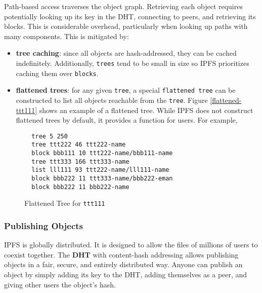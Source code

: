 \documentclass{sig-alternate}
\begin{document}
Path-based access traverses the object graph. Retrieving
each object requires potentially looking up its key in the DHT,
connecting to peers, and retrieving its blocks. This is considerable
overhead, particularly when looking up paths with many components.
This is mitigated by:
\begin{itemize}
  \item \textbf{tree caching}: since all objects are hash-addressed, they
        can be cached indefinitely. Additionally, \texttt{trees} tend to be
        small in size so IPFS prioritizes caching them over \texttt{blocks}.
  \item \textbf{flattened trees}: for any given \texttt{tree}, a special
        \texttt{flattened tree} can be constructed to list all objects
        reachable from the \texttt{tree}. Figure \ref{flattened-ttt111} shows
        an example of a flattened tree. While IPFS does not construct flattened
        trees by default, it provides a function for users. For example,
\end{itemize}

\begin{figure}
\begin{verbatim}
  tree 5 250
  tree ttt222 46 ttt222-name
  block bbb111 10 ttt222-name/bbb111-name
  tree ttt333 166 ttt333-name
  list lll111 93 ttt222-name/lll111-name
  block bbb222 11 ttt333-name/bbb222-eman
  block bbb222 11 bbb222-name
\end{verbatim}
\caption{Flattened Tree for \texttt{ttt111}} \label{fig:flattened-ttt111}
\end{figure}


\subsubsection{Publishing Objects}

IPFS is globally distributed. It is designed to allow the files of millions
of users to coexist together. The \textbf{DHT} with content-hash addressing
allows publishing objects in a fair, secure, and entirely distributed way.
Anyone can publish an object by simply adding its key to the DHT, adding
themselves as a peer, and giving other users the object's hash.
\end{document}
